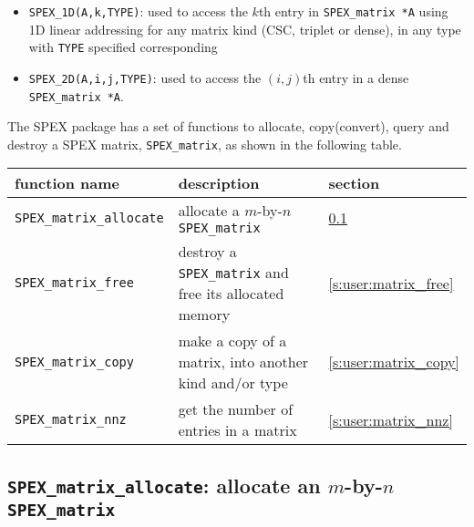 \documentclass[12pt]{report}
\theoremstyle{definition}
\begin{document}
\begin{itemize}

\item
\verb|SPEX_1D(A,k,TYPE)|: used to access the $k$th entry in
                         \verb|SPEX_matrix *A| using 1D linear addressing for
                         any matrix kind (CSC, triplet or dense), in any type
                         with \verb|TYPE| specified corresponding

\item
\verb|SPEX_2D(A,i,j,TYPE)|: used to access the $(i,j)$th entry in a dense
                            \verb|SPEX_matrix *A|.

\end{itemize}

The SPEX package has a set of functions to allocate, copy(convert), query and
destroy a SPEX matrix, \verb|SPEX_matrix|, as shown in the following table.

{\small
\begin{center}
\begin{tabular}{lp{2.5in}l}
\hline
function name & description & section \\
\hline
\verb|SPEX_matrix_allocate|
    & allocate a $m$-by-$n$ \verb|SPEX_matrix|
    & \ref{s:user:matrix_allocate} \\
\hline
\verb|SPEX_matrix_free|
    & destroy a \verb|SPEX_matrix| and free its allocated memory
    & \ref{s:user:matrix_free} \\
\hline
\verb|SPEX_matrix_copy|
    & make a copy of a matrix, into another kind and/or type
    & \ref{s:user:matrix_copy} \\
\hline
\verb|SPEX_matrix_nnz|
    & get the number of entries in a matrix
    & \ref{s:user:matrix_nnz} \\
\hline
\end{tabular}
\end{center}
}

\cprotect\subsection{\verb|SPEX_matrix_allocate|: allocate an $m$-by-$n$
\verb|SPEX_matrix|}
\label{s:user:matrix_allocate}
\end{document}
